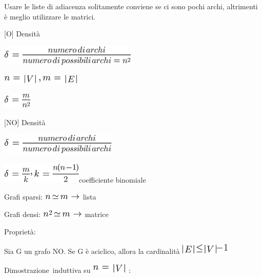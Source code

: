 \documentclass{article}
\begin{document}
{}

{}

{Usare le liste di adiacenza solitamente conviene se ci sono pochi
archi, altrimenti è meglio utilizzare le matrici.}

{}

{{[}O{]} Densità}

\includegraphics{images/image391.png}

\includegraphics{images/image376.png}

\includegraphics{images/image392.png}

{}

{{[}NO{]} Densità}

\includegraphics{images/image393.png}

\includegraphics{images/image394.png}{coefficiente binomiale}

{}

{Grafi sparsi: }\includegraphics{images/image395.png}{~}{lista}

{Grafi densi: }\includegraphics{images/image396.png}{~matrice}

{}

{Proprietà}{:}

{Sia G un grafo NO. }{Se G è aciclico}{, allora la cardinalità
}\includegraphics{images/image397.png}

{}

{Dimostrazione}{~induttiva su }\includegraphics{images/image398.png}{~:}
\end{document}
